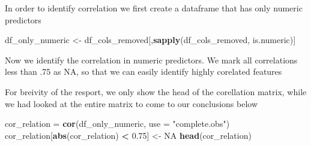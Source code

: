 \documentclass[
]{article}
\newenvironment{Shaded}{\begin{snugshade}}{\end{snugshade}}
\newcommand{\DataTypeTok}[1]{\textcolor[rgb]{0.13,0.29,0.53}{#1}}
\newcommand{\FloatTok}[1]{\textcolor[rgb]{0.00,0.00,0.81}{#1}}
\newcommand{\KeywordTok}[1]{\textcolor[rgb]{0.13,0.29,0.53}{\textbf{#1}}}
\newcommand{\NormalTok}[1]{#1}
\newcommand{\OperatorTok}[1]{\textcolor[rgb]{0.81,0.36,0.00}{\textbf{#1}}}
\newcommand{\OtherTok}[1]{\textcolor[rgb]{0.56,0.35,0.01}{#1}}
\newcommand{\StringTok}[1]{\textcolor[rgb]{0.31,0.60,0.02}{#1}}
\begin{document}
In order to identify correlation we first create a dataframe that has only numeric predictors

\begin{Shaded}
\begin{Highlighting}[]
\NormalTok{df_only_numeric <-}\StringTok{ }\NormalTok{df_cols_removed[,}\KeywordTok{sapply}\NormalTok{(df_cols_removed, is.numeric)]}
\end{Highlighting}
\end{Shaded}

Now we identify the correlation in numeric predictors. We mark all correlations less than .75 as NA, so that we can easily identify highly corelated features

For breivity of the resport, we only show the head of the corellation matrix, while we had looked at the entire matrix to come to our conclusions below

\begin{Shaded}
\begin{Highlighting}[]
\NormalTok{cor_relation =}\StringTok{ }\KeywordTok{cor}\NormalTok{(df_only_numeric, }\DataTypeTok{use =} \StringTok{"complete.obs"}\NormalTok{)}
\NormalTok{cor_relation[}\KeywordTok{abs}\NormalTok{(cor_relation) }\OperatorTok{<}\StringTok{ }\FloatTok{0.75}\NormalTok{] <-}\StringTok{ }\OtherTok{NA}
\KeywordTok{head}\NormalTok{(cor_relation)}
\end{Highlighting}
\end{Shaded}
\end{document}
